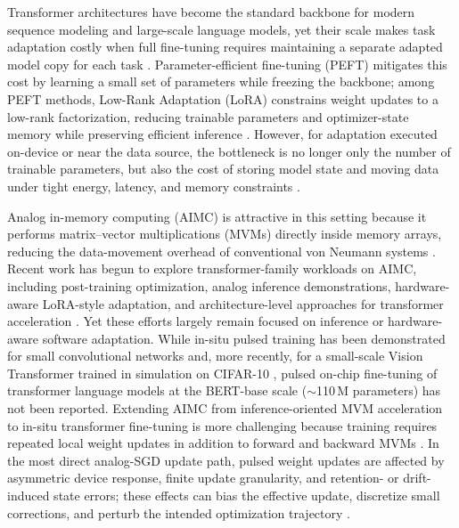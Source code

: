 \documentclass[AMA,LATO2COL]{WileyNJDv5}
\begin{document}
\noindent
Transformer architectures have become the standard backbone for modern sequence modeling and large-scale language models, yet their scale makes task adaptation costly when full fine-tuning requires maintaining a separate adapted model copy for each task \cite{vaswani2017attention,ding2023delta}.
Parameter-efficient fine-tuning (PEFT) mitigates this cost by learning a small set of parameters while freezing the backbone; among PEFT methods, Low-Rank Adaptation (LoRA) constrains weight updates to a low-rank factorization, reducing trainable parameters and optimizer-state memory while preserving efficient inference \cite{ding2023delta,hu2021lora}.
However, for adaptation executed on-device or near the data source, the bottleneck is no longer only the number of trainable parameters, but also the cost of storing model state and moving data under tight energy, latency, and memory constraints \cite{zhou2019edgeintelligence,sze2017efficient}.

\noindent
Analog in-memory computing (AIMC) is attractive in this setting because it performs matrix--vector multiplications (MVMs) directly inside memory arrays, reducing the data-movement overhead of conventional von Neumann systems \cite{ielmini2018imc,wan2022neurram,rasch2024fastrobust}.
Recent work has begun to explore transformer-family workloads on AIMC, including post-training optimization, analog inference demonstrations, hardware-aware LoRA-style adaptation, and architecture-level approaches for transformer acceleration \cite{lammie2024pt_roberta,chen2025albertanalog,li2026ahwa_lora,leroux2025aimc_attention,buchel2025moe_3d_aimc}.
Yet these efforts largely remain focused on inference or hardware-aware software adaptation.
While in-situ pulsed training has been demonstrated for small convolutional networks and, more recently, for a small-scale Vision Transformer trained in simulation on CIFAR-10 \cite{rasch2024fastrobust}, pulsed on-chip fine-tuning of transformer language models at the BERT-base scale ($\sim$110\,M parameters) has not been reported.
Extending AIMC from inference-oriented MVM acceleration to in-situ transformer fine-tuning is more challenging because training requires repeated local weight updates in addition to forward and backward MVMs \cite{ambrogio2018analogtraining,rasch2024fastrobust,wu2025responsefunctions}.
In the most direct analog-SGD update path, pulsed weight updates are affected by asymmetric device response, finite update granularity, and retention- or drift-induced state errors; these effects can bias the effective update, discretize small corrections, and perturb the intended optimization trajectory \cite{ambrogio2018analogtraining,wu2025responsefunctions,rasch2024fastrobust,aguirre2024memristor_ann_review}.
\end{document}
